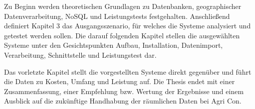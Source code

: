 Zu Beginn werden theoretischen Grundlagen zu Datenbanken, geographischer Datenverarbeitung, NoSQL und Leistungstests festgehalten.
Anschließend definiert Kapitel 3 das Ausgangsszenario, für welches die Systeme analysiert und getestet werden sollen.
Die darauf folgenden Kapitel stellen die ausgewählten Systeme unter den Gesichtspunkten Aufbau, Installation, Datenimport, Verarbeitung, Schnittstelle und Leistungstest dar.

Das vorletzte Kapitel stellt die vorgestellten Systeme direkt gegenüber und führt die Daten zu Kosten, Umfang und Leistung auf.
Die Thesis endet mit einer Zusammenfassung, einer Empfehlung bzw. Wertung der Ergebnisse und einem Ausblick auf die zukünftige Handhabung der räumlichen Daten bei Agri Con.